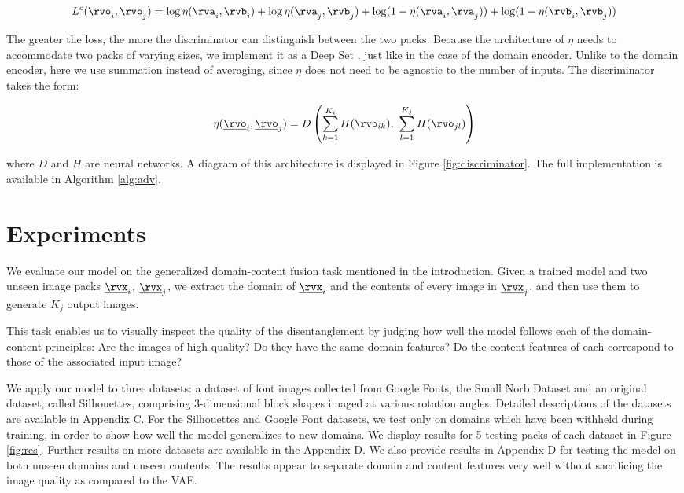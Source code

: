 \documentclass{article} %
\begin{document}
\begin{equation}
L^c (\underline{\rvo}_i, \underline{\rvo}_j) = \log \eta(\underline{\rva}_i, \underline{\rvb}_i) + \log \eta(\underline{\rva}_j, \underline{\rvb}_j) + \log (1 -  \eta(\underline{\rva}_i, \underline{\rva}_j)) + \log (1 -  \eta(\underline{\rvb}_i, \underline{\rvb}_j))
\end{equation}

The greater the loss, the more the discriminator can distinguish between the two packs. Because the architecture of $\eta$ needs to accommodate two packs of varying sizes, we implement it as a Deep Set \citep{zaheer2017deep}, just like in the case of the domain encoder. Unlike to the domain encoder, here we use summation instead of averaging, since $\eta$ does not need to be agnostic to the number of inputs. The discriminator takes the form: 

\begin{equation}
\eta (\underline{\rvo}_i, \underline{\rvo}_j) = D \left( \sum_{k=1}^{K_i} H(\rvo_{ik}), ~ \sum_{l=1}^{K_j} H(\rvo_{jl}) \right)
\end{equation}

where $D$ and $H$ are neural networks. A diagram of this architecture is displayed in Figure \ref{fig:discriminator}. The full implementation is available in Algorithm \ref{alg:adv}.

\section{Experiments}
\label{sec:exp}


We evaluate our model on the generalized domain-content fusion task mentioned in the introduction. Given a trained model and two unseen image packs $\underline{\rvx}_i$, $\underline{\rvx}_j$, we extract the domain of $\underline{\rvx}_i$ and the contents of every image in $\underline{\rvx}_j$, and then use them to generate $K_j$ output images.

This task enables us to visually inspect the quality of the disentanglement by judging how well the model follows each of the domain-content principles: Are the images of high-quality? Do they have the same domain features? Do the content features of each correspond to those of the associated input image?

We apply our model to three datasets: a dataset of font images collected from Google Fonts, the Small Norb Dataset \citep{lecun2004learning} and an original dataset, called Silhouettes, comprising 3-dimensional block shapes imaged at various rotation angles. Detailed descriptions of the datasets are available in Appendix C. For the Silhouettes and Google Font datasets, we test only on domains which have been withheld during training, in order to show how well the model generalizes to new domains. We display results for 5 testing packs of each dataset in Figure \ref{fig:res}. Further results on more datasets are available in the Appendix D. We also provide results in Appendix D for testing the model on both unseen domains and unseen contents. The results appear to separate domain and content features very well without sacrificing the image quality as compared to the VAE.
\end{document}
